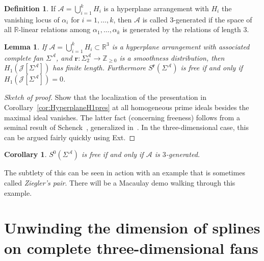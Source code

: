 \documentclass[11pt, reqno]{amsart}
\newcommand{\RR}{\mathbb{R}}
\newcommand{\ZZ}{\mathbb{Z}}
\newcommand{\br}{\mathbf{r}}
\newcommand{\calJ}{\mathcal{J}}
\newcommand{\A}{\mathcal{A}}
\newtheorem{lemma}[theorem]{Lemma}
\newtheorem{corollary}[theorem]{Corollary}
\theoremstyle{definition}
\newtheorem{definition}[theorem]{Definition}
\theoremstyle{remark}
\numberwithin{equation}{section}
\begin{document}
\begin{definition}
	If $\A=\bigcup_{i=1}^k H_i$ is a hyperplane arrangement with $H_i$ the vanishing locus of $\alpha_i$ for $i=1,\ldots,k$, then $\A$ is called $3$-generated if the space of all $\RR$-linear relations among $\alpha_1,\ldots,\alpha_k$ is generated by the relations of length $3$.
\end{definition}

\begin{lemma}
	If $\A=\bigcup_{i=1}^k H_i\subset\RR^3$ is a hyperplane arrangement with associated complete fan $\Sigma^\A$, and $\br:\Sigma^{\A}_2\to\ZZ_{\ge 0}$ is a smoothness distribution, then $H_1(\calJ[\Sigma^\A])$ has finite length.  Furthermore $S^{\br}(\Sigma^\A)$ is free if and only if $H_1(\calJ[\Sigma^\A])=0$.
\end{lemma}
\begin{proof}[Sketch of proof]
	Show that the localization of the presentation in Corollary~\ref{cor:HyperplaneH1pres} at all homogeneous prime ideals besides the maximal ideal vanishes.  The latter fact (concerning freeness) follows from a seminal result of Schenck~\cite{Spect}, generalized in~\cite[Theorem~3.4]{CohVan}.  In the three-dimensional case, this can be argued fairly quickly using Ext.
\end{proof}

\begin{corollary}
	$S^0(\Sigma^\A)$ is free if and only if $\A$ is $3$-generated.
\end{corollary}

The subtlety of this can be seen in action with an example that is sometimes called \textit{Ziegler's pair}.  There will be a Macaulay demo walking through this example.

\section{Unwinding the dimension of splines on complete three-dimensional fans}
\end{document}
